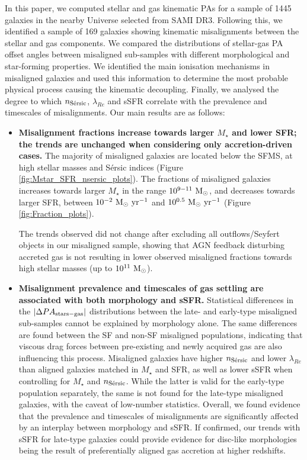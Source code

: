 \documentclass[fleqn,usenatbib]{mnras}
\begin{document}
In this paper, we computed stellar and gas kinematic PAs for a sample of 1445 galaxies in the nearby Universe selected from SAMI DR3. Following this, we identified a sample of 169 galaxies showing kinematic misalignments between the stellar and gas components. We compared the distributions of stellar-gas PA offset angles between misaligned sub-samples with different morphological and star-forming properties. We identified the main ionisation mechanisms in misaligned galaxies and used this information to determine the most probable physical process causing the kinematic decoupling. Finally, we analysed the degree to which $n_{\rm{S\Acute{e}rsic}}$, $\lambda_{Re}$ and sSFR correlate with the prevalence and timescales of misalignments. Our main results are as follows:

\begin{itemize}
    
    \item \textbf{Misalignment fractions increase towards larger $M_{\star}$ and lower SFR; the trends are unchanged when considering only accretion-driven cases.} The majority of misaligned galaxies are located below the SFMS, at high stellar masses and S\'ersic indices (Figure \ref{fig:Mstar_SFR_nsersic_plots}). The fractions of misaligned galaxies increases towards larger $M_{\star}$ in the range $10^{9-11}\ \rm{M_{\odot}}$, and decreases towards larger SFR, between $10^{-2}\ \rm{M_{\odot}\ yr^{-1}}$ and $10^{0.5}\ \rm{M_{\odot}\ yr^{-1}}$ (Figure \ref{fig:Fraction_plots}). 
    
    The trends observed did not change after excluding all outflows/Seyfert objects in our misaligned sample, showing that AGN feedback disturbing accreted gas is not resulting in lower observed misaligned fractions towards high stellar masses (up to ${10^{11}}\ \rm{M_{\odot}}$). 
    
    \item \textbf{Misalignment prevalence and timescales of gas settling are associated with both morphology and sSFR.} Statistical differences in the $|\Delta PA_{\rm{stars-gas}}|$ distributions between the late- and early-type misaligned sub-samples cannot be explained by morphology alone. The same differences
    are found between the SF and non-SF misaligned populations, indicating
    that viscous drag forces between pre-existing and newly acquired
    gas are also influencing this process. Misaligned galaxies have higher $n_{\rm{S\Acute{e}rsic}}$ and lower $\lambda_{Re}$ than aligned galaxies matched in $M_{\star}$ and SFR, as well as lower sSFR when controlling for $M_{\star}$ and $n_{\rm{S\Acute{e}rsic}}$. While the latter is valid for the early-type population separately, the same is not found for the late-type misaligned galaxies, with the caveat of low-number statistics. Overall, we found evidence that the prevalence and timescales of misalignments are significantly affected by an interplay between morphology and sSFR. If confirmed, our trends with sSFR for late-type galaxies could provide evidence for disc-like morphologies being the result of preferentially aligned gas accretion at higher redshifts.
    

\end{itemize}
\end{document}
